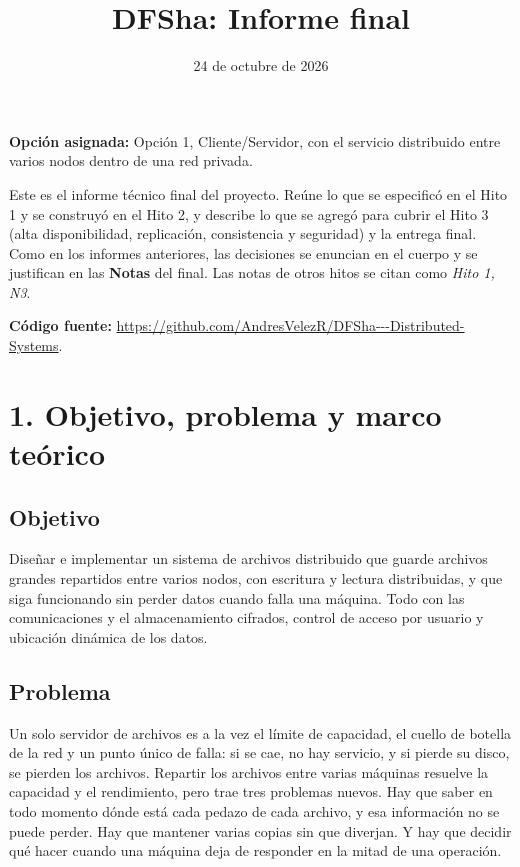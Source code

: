 \documentclass[10pt]{article}
\title{DFSha: Informe final}
\date{24 de octubre de 2026}
\begin{document}
\portada

\textbf{Opción asignada:} Opción 1, Cliente/Servidor, con el servicio distribuido entre varios nodos dentro de una red privada.

Este es el informe técnico final del proyecto. Reúne lo que se especificó en el Hito 1 y se construyó en el Hito 2, y describe lo que se agregó para cubrir el Hito 3 (alta disponibilidad, replicación, consistencia y seguridad) y la entrega final. Como en los informes anteriores, las decisiones se enuncian en el cuerpo y se justifican en las \textbf{Notas} del final. Las notas de otros hitos se citan como \emph{Hito 1, N3}.

\textbf{Código fuente:} \url{https://github.com/AndresVelezR/DFSha---Distributed-Systems}.

\separador

\section{1. Objetivo, problema y marco teórico}

\subsection{Objetivo}

Diseñar e implementar un sistema de archivos distribuido que guarde archivos grandes repartidos entre varios nodos, con escritura y lectura distribuidas, y que siga funcionando sin perder datos cuando falla una máquina. Todo con las comunicaciones y el almacenamiento cifrados, control de acceso por usuario y ubicación dinámica de los datos.

\subsection{Problema}

Un solo servidor de archivos es a la vez el límite de capacidad, el cuello de botella de la red y un punto único de falla: si se cae, no hay servicio, y si pierde su disco, se pierden los archivos. Repartir los archivos entre varias máquinas resuelve la capacidad y el rendimiento, pero trae tres problemas nuevos. Hay que saber en todo momento dónde está cada pedazo de cada archivo, y esa información no se puede perder. Hay que mantener varias copias sin que diverjan. Y hay que decidir qué hacer cuando una máquina deja de responder en la mitad de una operación.
\end{document}
